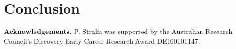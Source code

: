 \documentclass[12pt]{article}
\newcommand{\1}{\mathbf 1}
\begin{document}







\section{Conclusion}


{\bf Acknowledgements.} P. Straka was supported by the Australian Research Council’s Discovery Early Career Research Award DE160101147.
\end{document}
